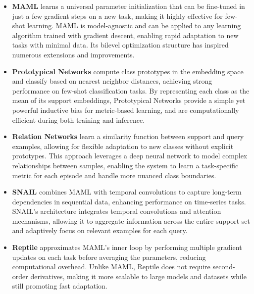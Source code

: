 \begin{itemize}

    \item \textbf{MAML} \cite{finn2017maml} learns a universal parameter initialization that can be fine-tuned in just a few gradient steps on a new task, making it highly effective for few-shot learning. MAML is model-agnostic and can be applied to any learning algorithm trained with gradient descent, enabling rapid adaptation to new tasks with minimal data. Its bilevel optimization structure has inspired numerous extensions and improvements.

    \item \textbf{Prototypical Networks} \cite{snell2017prototypical} compute class prototypes in the embedding space and classify based on nearest neighbor distances, achieving strong performance on few‑shot classification tasks. By representing each class as the mean of its support embeddings, Prototypical Networks provide a simple yet powerful inductive bias for metric-based learning, and are computationally efficient during both training and inference.
    
    \item \textbf{Relation Networks} \cite{sung2017learning} learn a similarity function between support and query examples, allowing for flexible adaptation to new classes without explicit prototypes. This approach leverages a deep neural network to model complex relationships between samples, enabling the system to learn a task-specific metric for each episode and handle more nuanced class boundaries.
    
    \item \textbf{SNAIL} \cite{mishra2017simple} combines MAML with temporal convolutions to capture long‑term dependencies in sequential data, enhancing performance on time‑series tasks. SNAIL’s architecture integrates temporal convolutions and attention mechanisms, allowing it to aggregate information across the entire support set and adaptively focus on relevant examples for each query.
    
    \item \textbf{Reptile} \cite{nichol2018first} approximates MAML’s inner loop by performing multiple gradient updates on each task before averaging the parameters, reducing computational overhead. Unlike MAML, Reptile does not require second-order derivatives, making it more scalable to large models and datasets while still promoting fast adaptation.
    

\end{itemize}
